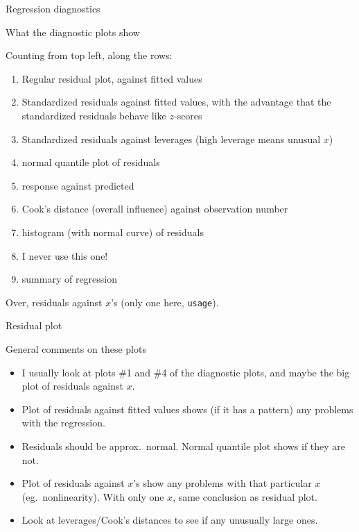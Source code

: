 \documentclass[unknownkeysallowed]{beamer}\usepackage[]{graphicx}\usepackage[]{color}
\begin{document}
\begin{frame}[fragile]{Regression diagnostics}
  
  
\end{frame}

\begin{frame}[fragile]{What the diagnostic plots show}
  
  Counting from top left, along the rows:
  
  \begin{enumerate}
  \item Regular residual plot, against fitted values 
  \item Standardized residuals against fitted values, with the
    advantage that the standardized residuals behave like $z$-scores
  \item Standardized residuals against leverages (high leverage means
    unusual $x$)
  \item normal quantile plot of residuals
  \item response against predicted
  \item Cook's distance (overall influence) against observation number
  \item histogram (with normal curve) of residuals
  \item I never use this one!
  \item summary of regression
  \end{enumerate}
  
  Over, residuals against $x$'s (only one here, \texttt{usage}).
  
\end{frame}

\begin{frame}[fragile]{Residual plot}
  
  
\end{frame}

\begin{frame}[fragile]{General comments on these plots}
  
  \begin{itemize}
  \item I usually look at plots \#1 and \#4 of the diagnostic plots,
    and maybe the big plot of residuals against $x$.
  \item Plot of residuals against fitted values shows (if it has a
    pattern) any problems with the regression.
  \item Residuals should be approx.\ normal. Normal quantile plot
    shows if they are not.
  \item Plot of residuals against $x$'s show any problems with that
    particular $x$ (eg.\ nonlinearity). With only one $x$, same
    conclusion as residual plot.
  \item Look at leverages/Cook's distances to see if any unusually
    large ones.
  \end{itemize}
  
\end{frame}
\end{document}
